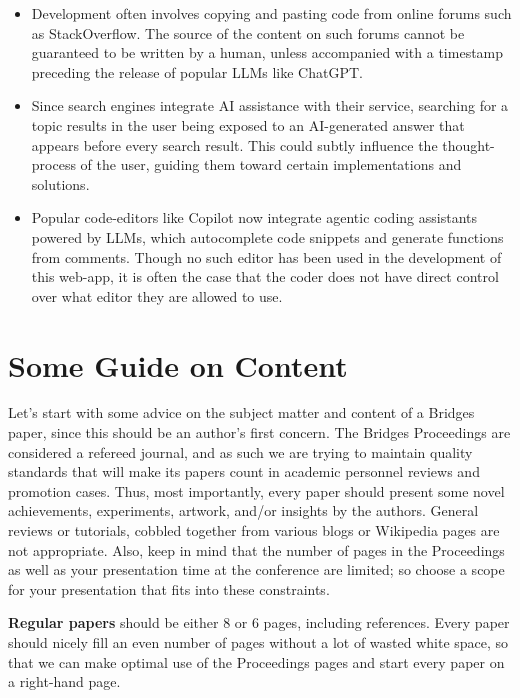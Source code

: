 \documentclass[letterpaper,11pt]{article}
\begin{document}
\begin{itemize}
	\item Development often involves copying and pasting code from online forums such as StackOverflow. The source of the content on such forums cannot be guaranteed to be written by a human, unless accompanied with a timestamp preceding the release of popular LLMs like ChatGPT.
	\item Since search engines integrate AI assistance with their service, searching for a topic results in the user being exposed to an AI-generated answer that appears before every search result. This could subtly influence the thought-process of the user, guiding them toward certain implementations and solutions.
	\item Popular code-editors like Copilot now integrate agentic coding assistants powered by LLMs, which autocomplete code snippets and generate functions from comments. Though no such editor has been used in the development of this web-app, it is often the case that the coder does not have direct control over what editor they are allowed to use.
\end{itemize}

\section*{Some Guide on Content}


Let's start with some advice on the subject matter and content of a
Bridges paper, since this should be an author's first concern. The
Bridges Proceedings are considered a refereed journal, and as such we
are trying to maintain quality standards that will make its papers count
in academic personnel reviews and promotion cases. Thus, most
importantly, every paper should present some novel achievements,
experiments, artwork, and/or insights by the authors. General reviews or
tutorials, cobbled together from various blogs or Wikipedia pages are
not appropriate. Also, keep in mind that the number of pages in the
Proceedings as well as your presentation time at the conference are
limited; so choose a scope for your presentation that fits into these
constraints.

\textbf{Regular papers} should be either 8 or 6 pages, including references. Every paper should nicely
fill an even number of pages without a lot of wasted white space, so
that we can make optimal use of the Proceedings pages and start every
paper on a right-hand page.
\end{document}
